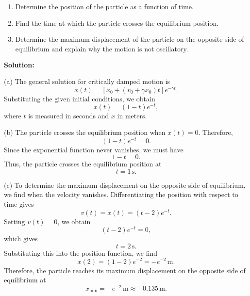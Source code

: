 \documentclass[12pt]{article}
\begin{document}
\begin{enumerate}
    \item[(a)] Determine the position of the particle as a function of time.
    \item[(b)] Find the time at which the particle crosses the equilibrium position.
    \item[(c)] Determine the maximum displacement of the particle on the opposite side of equilibrium and explain why the motion is not oscillatory.
\end{enumerate}

\textbf{Solution:}

(a) The general solution for critically damped motion is
\begin{equation}
    x(t)=\left[x_0+(v_0+\gamma x_0)t\right]e^{-\gamma t}.
\end{equation}
Substituting the given initial conditions, we obtain
\begin{equation}
    \boxed{x(t)=(1-t)e^{-t},}
\end{equation}
where $t$ is measured in seconds and $x$ in meters.

(b) The particle crosses the equilibrium position when $x(t)=0$.
Therefore,
\begin{equation}
    (1-t)e^{-t}=0.
\end{equation}
Since the exponential function never vanishes, we must have
\begin{equation}
    1-t=0.
\end{equation}
Thus, the particle crosses the equilibrium position at
\begin{equation}
    \boxed{t=1\,\mathrm{s}.}
\end{equation}

(c) To determine the maximum displacement on the opposite side
of equilibrium, we find when the velocity vanishes.
Differentiating the position with respect to time gives
\begin{equation}
    v(t)=\dot{x}(t)=(t-2)e^{-t}.
\end{equation}
Setting $v(t)=0$, we obtain
\begin{equation}
    (t-2)e^{-t}=0,
\end{equation}
which gives
\begin{equation}
    t=2\,\mathrm{s}.
\end{equation}
Substituting this into the position function, we find
\begin{equation}
    x(2)=(1-2)e^{-2}=-e^{-2}\,\mathrm{m}.
\end{equation}
Therefore, the particle reaches its maximum displacement
on the opposite side of equilibrium at
\begin{equation}
    \boxed{x_{\min}=-e^{-2}\,\mathrm{m}\approx-0.135\,\mathrm{m}.}
\end{equation}
\end{document}
